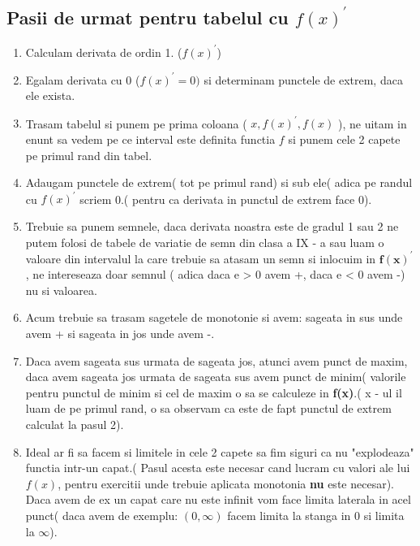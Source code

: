 \documentclass[11pt]{article}
\begin{document}
\begin{flushleft}
    \subsection*{Pasii de urmat pentru tabelul cu $f(x)^\prime$}
    \begin{enumerate}[1).]
        \item   Calculam derivata de ordin 1. ($f(x)^\prime$)
        \item   Egalam derivata cu 0 ($f(x)^\prime = 0)$ si determinam punctele de extrem, daca ele exista.
        \item   Trasam tabelul si punem pe prima coloana ( $x, f(x)^\prime, f(x)$ ), ne uitam in enunt sa
                vedem pe ce interval este definita functia $f$ si punem cele 2 capete pe primul rand din
                tabel.
        \item   Adaugam punctele de extrem( tot pe primul rand) si sub ele( adica pe randul cu $f(x)^\prime$
                scriem 0.( pentru ca derivata in punctul de extrem face 0).
        \item   Trebuie sa punem semnele, daca derivata noastra este de gradul 1 sau 2 ne putem folosi de 
                tabele de variatie de semn din clasa a IX - a sau luam o valoare din intervalul la care
                trebuie sa atasam un semn si inlocuim in $\mathbf{f(x)^\prime}$, ne intereseaza doar semnul 
                ( adica daca e > 0 avem +, daca e < 0 avem -) nu si valoarea.
        \item   Acum trebuie sa trasam sagetele de monotonie si avem: sageata in sus unde avem + si
                sageata in jos unde avem -.
        \item   Daca avem sageata sus urmata de sageata jos, atunci avem punct de maxim, daca avem sageata
                jos urmata de sageata sus avem punct de minim( valorile pentru punctul de minim si cel de
                maxim o sa se calculeze in \textbf{f(x)}.( x - ul il luam de pe primul rand, o sa observam
                ca este de fapt punctul de extrem calculat la pasul 2).
        \item   Ideal ar fi sa facem si limitele in cele 2 capete sa fim siguri ca nu "explodeaza" functia
                intr-un capat.( Pasul acesta este necesar cand lucram cu valori ale lui $f(x)$, pentru 
                exercitii unde trebuie aplicata monotonia \textbf{nu} este necesar). Daca avem de ex un
                capat care nu
                este infinit vom face limita laterala in acel punct( daca avem de exemplu: $(0, \infty)$
                facem limita la stanga in 0 si limita la $\infty$).
    \end{enumerate}


\end{flushleft}
\end{document}
